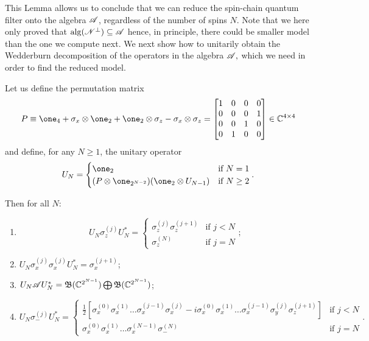 \documentclass[aihp,12pt]{imsart}
\begin{document}
This Lemma allows us to conclude that we can reduce the spin-chain quantum filter onto the algebra $\mathscr{A}$, regardless of the number of spins $N$. Note that we here only proved that ${\rm alg}(\mathscr{N}^\perp) \subseteq \mathscr{A}$ hence, in principle, there could be smaller model than the one we compute next. 
We next show how to unitarily obtain the Wedderburn decomposition of the operators in the algebra $\mathscr{A},$ which we need in order to find the reduced model. 

\begin{lemma}
    Let us define the permutation matrix \[P \equiv \one_4 + \sigma_x\otimes\one_2 + \one_2\otimes\sigma_z  -\sigma_x\otimes\sigma_z = \begin{bmatrix}
        1&0&0&0\\0&0&0&1\\0&0&1&0\\0&1&0&0
    \end{bmatrix} \in\Cb^{4\times4}\] and define, for any $N\geq1$, the unitary operator \[U_N = \begin{cases}
        \one_2 & \text{if }N=1\\
        (P\otimes\one_{2^{N-2}})(\one_2\otimes U_{N-1}) &\text{if } N\geq2
    \end{cases}.\]

    Then for all $N$: 
    \begin{enumerate}
        \item \[U_N \sigma_z^{(j)} U_N^* = \begin{cases}
            \sigma_z^{(j)}\sigma_z^{(j+1)}&\text{if }j<N\\
            \sigma_z^{(N)}&\text{if }j=N
        \end{cases};\]
        \item \(U_N \sigma_x^{(j)}\sigma_x^{(j)} U_N^* = \sigma_x^{(j+1)}\);
        \item $U_N \mathscr{A} U_N^* = \mathfrak{B}(\mathbb{C}^{2^{N-1}}) \bigoplus \mathfrak{B}(\mathbb{C}^{2^{N-1}})$;
        \item 
        \[U_N \sigma_-^{(j)} U_N^* =\begin{cases}
            \frac{1}{2}\left[\sigma_x^{(0)}\sigma_x^{(1)}\dots\sigma_x^{(j-1)}\sigma_x^{(j)} -i \sigma_x^{(0)}\sigma_x^{(1)}\dots\sigma_x^{(j-1)}\sigma_y^{(j)} \sigma_z^{(j+1)} \right]&\text{if }j < N\\
            \sigma_x^{(0)}\sigma_x^{(1)}\dots\sigma_x^{(N-1)}\sigma_-^{(N)}&\text{if }j=N
        \end{cases}. \]
    \end{enumerate}
\end{lemma}
\end{document}
